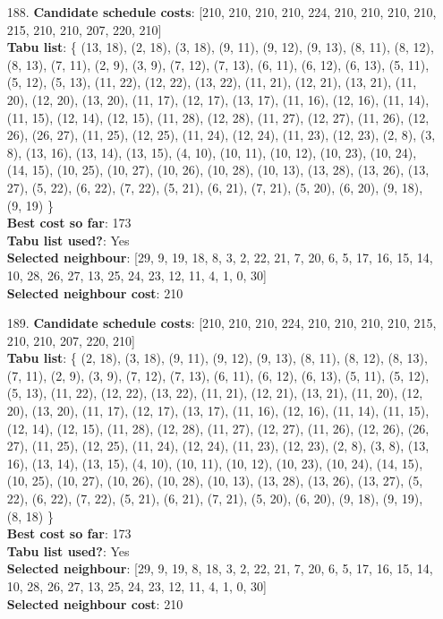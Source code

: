 \documentclass[fleqn]{article}
\begin{document}
\begin{itemize}
    \item[188.] \textbf{Candidate schedule costs}: [210, 210, 210, 210, 224, 210, 210, 210, 210, 215, 210, 210, 207, 220, 210] \\
    \textbf{Tabu list}: \{ (13, 18), (2, 18), (3, 18), (9, 11), (9, 12), (9, 13), (8, 11), (8, 12), (8, 13), (7, 11), (2, 9), (3, 9), (7, 12), (7, 13), (6, 11), (6, 12), (6, 13), (5, 11), (5, 12), (5, 13), (11, 22), (12, 22), (13, 22), (11, 21), (12, 21), (13, 21), (11, 20), (12, 20), (13, 20), (11, 17), (12, 17), (13, 17), (11, 16), (12, 16), (11, 14), (11, 15), (12, 14), (12, 15), (11, 28), (12, 28), (11, 27), (12, 27), (11, 26), (12, 26), (26, 27), (11, 25), (12, 25), (11, 24), (12, 24), (11, 23), (12, 23), (2, 8), (3, 8), (13, 16), (13, 14), (13, 15), (4, 10), (10, 11), (10, 12), (10, 23), (10, 24), (14, 15), (10, 25), (10, 27), (10, 26), (10, 28), (10, 13), (13, 28), (13, 26), (13, 27), (5, 22), (6, 22), (7, 22), (5, 21), (6, 21), (7, 21), (5, 20), (6, 20), (9, 18), (9, 19) \} \\
    \textbf{Best cost so far}: 173 \\
    \textbf{Tabu list used?}: Yes \\
    \textbf{Selected neighbour}: [29, 9, 19, 18, 8, 3, 2, 22, 21, 7, 20, 6, 5, 17, 16, 15, 14, 10, 28, 26, 27, 13, 25, 24, 23, 12, 11, 4, 1, 0, 30] \\
    \textbf{Selected neighbour cost}: 210
      

    \item[189.] \textbf{Candidate schedule costs}: [210, 210, 210, 224, 210, 210, 210, 210, 215, 210, 210, 207, 220, 210] \\
    \textbf{Tabu list}: \{ (2, 18), (3, 18), (9, 11), (9, 12), (9, 13), (8, 11), (8, 12), (8, 13), (7, 11), (2, 9), (3, 9), (7, 12), (7, 13), (6, 11), (6, 12), (6, 13), (5, 11), (5, 12), (5, 13), (11, 22), (12, 22), (13, 22), (11, 21), (12, 21), (13, 21), (11, 20), (12, 20), (13, 20), (11, 17), (12, 17), (13, 17), (11, 16), (12, 16), (11, 14), (11, 15), (12, 14), (12, 15), (11, 28), (12, 28), (11, 27), (12, 27), (11, 26), (12, 26), (26, 27), (11, 25), (12, 25), (11, 24), (12, 24), (11, 23), (12, 23), (2, 8), (3, 8), (13, 16), (13, 14), (13, 15), (4, 10), (10, 11), (10, 12), (10, 23), (10, 24), (14, 15), (10, 25), (10, 27), (10, 26), (10, 28), (10, 13), (13, 28), (13, 26), (13, 27), (5, 22), (6, 22), (7, 22), (5, 21), (6, 21), (7, 21), (5, 20), (6, 20), (9, 18), (9, 19), (8, 18) \} \\
    \textbf{Best cost so far}: 173 \\
    \textbf{Tabu list used?}: Yes \\
    \textbf{Selected neighbour}: [29, 9, 19, 8, 18, 3, 2, 22, 21, 7, 20, 6, 5, 17, 16, 15, 14, 10, 28, 26, 27, 13, 25, 24, 23, 12, 11, 4, 1, 0, 30] \\
    \textbf{Selected neighbour cost}: 210
      


\end{itemize}
\end{document}
